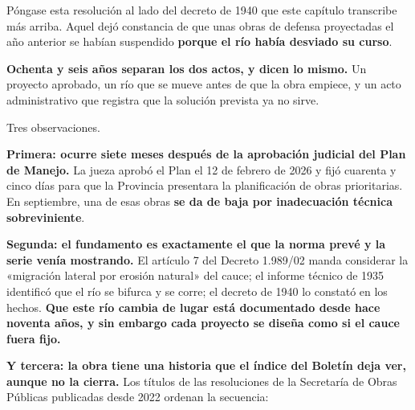 Póngase esta resolución al lado del decreto de 1940 que este capítulo transcribe más arriba. Aquel dejó constancia de que unas obras de defensa proyectadas el año anterior se habían suspendido \textbf{porque el río había desviado su curso}.

\textbf{Ochenta y seis años separan los dos actos, y dicen lo mismo.} Un proyecto aprobado, un río que se mueve antes de que la obra empiece, y un acto administrativo que registra que la solución prevista ya no sirve.

Tres observaciones.

\textbf{Primera: ocurre siete meses después de la aprobación judicial del Plan de Manejo.} La
jueza aprobó el Plan el 12 de febrero de 2026 y fijó cuarenta y cinco días para que la
Provincia presentara la planificación de obras prioritarias. En septiembre, una de esas obras
\textbf{se da de baja por inadecuación técnica sobreviniente}.

\textbf{Segunda: el fundamento es exactamente el que la norma prevé y la serie venía mostrando.} El artículo 7 del
Decreto 1.989/02 manda considerar la «migración lateral por erosión natural» del cauce; el
informe técnico de 1935 identificó que el río se bifurca y se corre; el decreto de 1940 lo
constató en los hechos. \textbf{Que este río cambia de lugar está documentado desde hace
noventa años, y sin embargo cada proyecto se diseña como si el cauce fuera fijo.}

\textbf{Y tercera: la obra tiene una historia que el índice del Boletín deja ver, aunque no la cierra.} Los títulos de las resoluciones de la Secretaría de Obras Públicas publicadas desde 2022 ordenan la secuencia:

